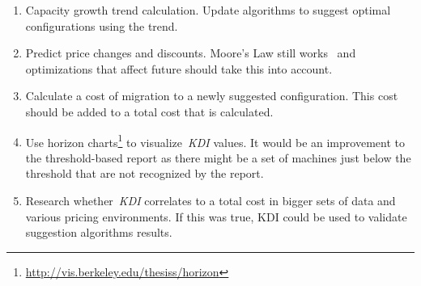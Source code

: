 \documentclass[]{final_report}
\begin{document}
\begin{enumerate}
\item Capacity growth trend calculation. Update algorithms to suggest optimal configurations using the trend. 
\item Predict price changes and discounts. Moore's Law still works~\cite{7057609} and optimizations that affect future should take this into account.
\item Calculate a cost of migration to a newly suggested configuration. This cost should be added to a total cost that is calculated.
\item Use horizon charts\footnote{\url{http://vis.berkeley.edu/thesiss/horizon}} to visualize~\textit{KDI} values. It would be an improvement to the threshold-based report as there might be a set of machines just below the threshold that are not recognized by the report.
\item Research whether~\textit{KDI} correlates to a total cost in bigger sets of data and various pricing environments. If this was true, KDI could be used to validate suggestion algorithms results. 



\end{enumerate}


\newpage

\label{endpage}
{}

\end{document}

